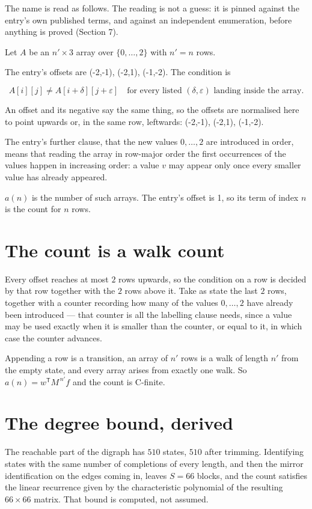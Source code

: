 \documentclass[11pt]{article}
\theoremstyle{definition}
\begin{document}
The name is read as follows. The reading is not a guess: it is pinned against the entry's own published terms, and against an independent enumeration, before anything is proved (Section 7).

Let $A$ be an $n' \times 3$ array over $\{0,\dots,2\}$ with $n' = n$ rows.

The entry's offsets are (-2,-1), (-2,1), (-1,-2). The condition is

\[A[i][j] \ne A[i{+}\delta][j{+}\varepsilon]\quad\text{for every listed }(\delta,\varepsilon)\text{ landing inside the array.}\]

An offset and its negative say the same thing, so the offsets are normalised here to point upwards or, in the same row, leftwards: (-2,-1), (-2,1), (-1,-2).

The entry's further clause, that the new values $0,\dots,2$ are introduced in order, means that reading the array in row-major order the first occurrences of the values happen in increasing order: a value $v$ may appear only once every smaller value has already appeared.

$a(n)$ is the number of such arrays. The entry's offset is 1, so its term of index $n$ is the count for $n$ rows.

\section{The count is a walk count}

Every offset reaches at most $2$ rows upwards, so the condition on a row is decided by that row together with the $2$ rows above it. Take as state the last $2$ rows, together with a counter recording how many of the values $0,\dots,2$ have already been introduced --- that counter is all the labelling clause needs, since a value may be used exactly when it is smaller than the counter, or equal to it, in which case the counter advances.

Appending a row is a transition, an array of $n'$ rows is a walk of length $n'$ from the empty state, and every array arises from exactly one walk. So $a(n) = w^{\mathsf T}M^{\,n'}f$ and the count is C-finite.

\section{The degree bound, derived}

The reachable part of the digraph has $510$ states, $510$ after trimming. Identifying states with the same number of completions of every length, and then the mirror identification on the edges coming in, leaves $S = 66$ blocks, and the count satisfies the linear recurrence given by the characteristic polynomial of the resulting $66\times66$ matrix. That bound is computed, not assumed.
\end{document}
